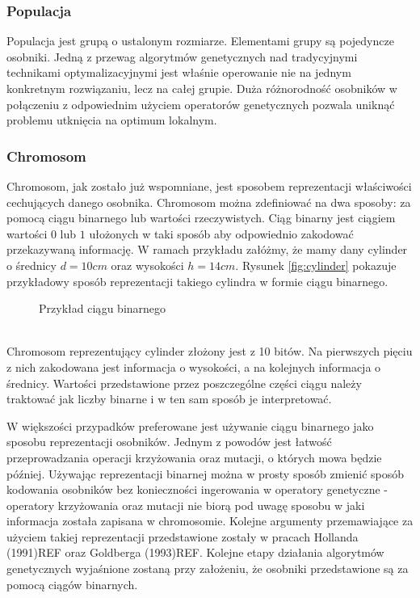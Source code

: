 \documentclass[twoside]{iisthesis}
\begin{document}
\subsubsection{Populacja}
Populacja jest grupą o ustalonym rozmiarze. Elementami grupy są pojedyncze osobniki. Jedną z przewag algorytmów genetycznych nad tradycyjnymi technikami optymalizacyjnymi jest właśnie operowanie nie na jednym konkretnym rozwiązaniu, lecz na całej grupie. Duża różnorodność osobników w połączeniu z odpowiednim użyciem operatorów genetycznych pozwala uniknąć problemu utknięcia na optimum lokalnym.
\subsubsection{Chromosom}
Chromosom, jak zostało już wspomniane, jest sposobem reprezentacji właściwości cechujących danego osobnika. Chromosom można zdefiniować na dwa sposoby: za pomocą ciągu binarnego lub wartości rzeczywistych. Ciąg binarny jest ciągiem wartości $0$ lub $1$ ułożonych w taki sposób aby odpowiednio zakodować przekazywaną informację. W ramach przykładu załóżmy, że mamy dany cylinder o średnicy $d = 10 cm$ oraz wysokości $h = 14 cm$. Rysunek \eqref{fig:cylinder} pokazuje przykładowy sposób reprezentacji takiego cylindra w formie ciągu binarnego. 
\begin{figure}[!htb]
	\centering
	\caption{Przykład ciągu binarnego}
	\label{fig:cylinder}
\end{figure}
\\Chromosom reprezentujący cylinder złożony jest z 10 bitów. Na pierwszych pięciu z nich zakodowana jest informacja o wysokości, a na kolejnych informacja o średnicy. Wartości przedstawione przez poszczególne części ciągu należy traktować jak liczby binarne i w ten sam sposób je interpretować.

W większości przypadków preferowane jest używanie ciągu binarnego jako sposobu reprezentacji osobników. Jednym z powodów jest łatwość przeprowadzania operacji krzyżowania oraz mutacji, o których mowa będzie później. Używając reprezentacji binarnej można w prosty sposób zmienić sposób kodowania osobników bez konieczności ingerowania w operatory genetyczne - operatory krzyżowania oraz mutacji nie biorą pod uwagę sposobu w jaki informacja została zapisana w chromosomie. Kolejne argumenty przemawiające za użyciem takiej reprezentacji przedstawione zostały w pracach Hollanda (1991)REF oraz Goldberga (1993)REF. Kolejne etapy działania algorytmów genetycznych wyjaśnione zostaną przy założeniu, że osobniki przedstawione są za pomocą ciągów binarnych.
\end{document}
